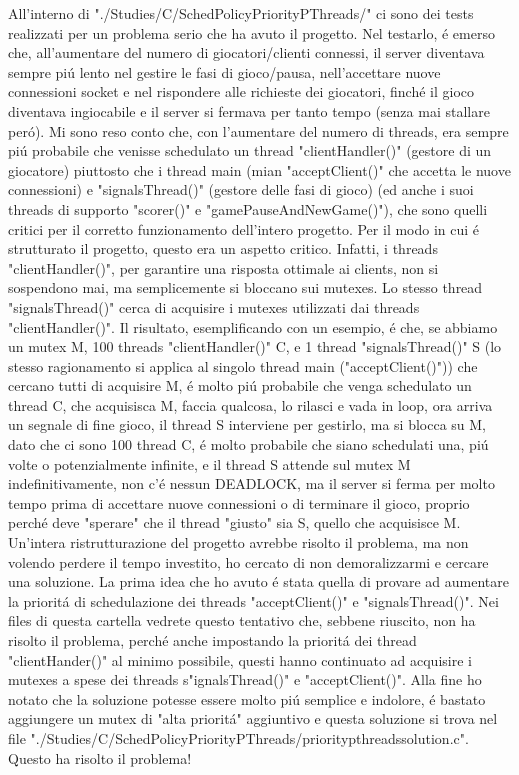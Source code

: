 All'interno di "./Studies/C/SchedPolicyPriorityPThreads/" ci sono dei tests realizzati per un problema serio che ha avuto il progetto. Nel testarlo, \'e emerso che, all'aumentare del numero di giocatori/clienti connessi, il server diventava sempre pi\'u lento nel gestire le fasi di gioco/pausa, nell'accettare nuove connessioni socket e nel rispondere alle richieste dei giocatori, finch\'e il gioco diventava ingiocabile e il server si fermava per tanto tempo (senza mai stallare per\'o). Mi sono reso conto che, con l'aumentare del numero di threads, era sempre pi\'u probabile che venisse schedulato un thread "clientHandler()" (gestore di un giocatore) piuttosto che i thread main (mian "acceptClient()" che accetta le nuove connessioni) e "signalsThread()" (gestore delle fasi di gioco) (ed anche i suoi threads di supporto "scorer()" e "gamePauseAndNewGame()"), che sono quelli critici per il corretto funzionamento dell'intero progetto. Per il modo in cui \'e strutturato il progetto, questo era un aspetto critico. Infatti, i threads "clientHandler()", per garantire una risposta ottimale ai clients, non si sospendono mai, ma semplicemente si bloccano sui mutexes. Lo stesso thread "signalsThread()" cerca di acquisire i mutexes utilizzati dai threads "clientHandler()". Il risultato, esemplificando con un esempio, \'e che, se abbiamo un mutex M, 100 threads "clientHandler()" C, e 1 thread "signalsThread()" S (lo stesso ragionamento si applica al singolo thread main ("acceptClient()")) che cercano tutti di acquisire M, \'e molto pi\'u probabile che venga schedulato un thread C, che acquisisca M, faccia qualcosa, lo rilasci e vada in loop, ora arriva un segnale di fine gioco, il thread S interviene per gestirlo, ma si blocca su M, dato che ci sono 100 thread C, \'e molto probabile che siano schedulati una, pi\'u volte o potenzialmente infinite, e il thread S attende sul mutex M indefinitivamente, non c'\'e nessun DEADLOCK, ma il server si ferma per molto tempo prima di accettare nuove connessioni o di terminare il gioco, proprio perch\'e deve "sperare" che il thread "giusto" sia S, quello che acquisisce M. Un'intera ristrutturazione del progetto avrebbe risolto il problema, ma non volendo perdere il tempo investito, ho cercato di non demoralizzarmi e cercare una soluzione. La prima idea che ho avuto \'e stata quella di provare ad aumentare la priorit\'a di schedulazione dei threads "acceptClient()" e "signalsThread()". Nei files di questa cartella vedrete questo tentativo che, sebbene riuscito, non ha risolto il problema, perch\'e anche impostando la priorit\'a dei thread "clientHander()" al minimo possibile, questi hanno continuato ad acquisire i mutexes a spese dei threads s"ignalsThread()" e "acceptClient()". Alla fine ho notato che la soluzione potesse essere molto pi\'u semplice e indolore, \'e bastato aggiungere un mutex di "alta priorit\'a" aggiuntivo e questa soluzione si trova nel file "./Studies/C/SchedPolicyPriorityPThreads/prioritypthreadssolution.c". Questo ha risolto il problema!

\iffalse
\begin{figure}[H]
    \centering
    \texttt{[image: immagine.png]}
    \caption{Descrizione.}
\end{figure}
\fi

